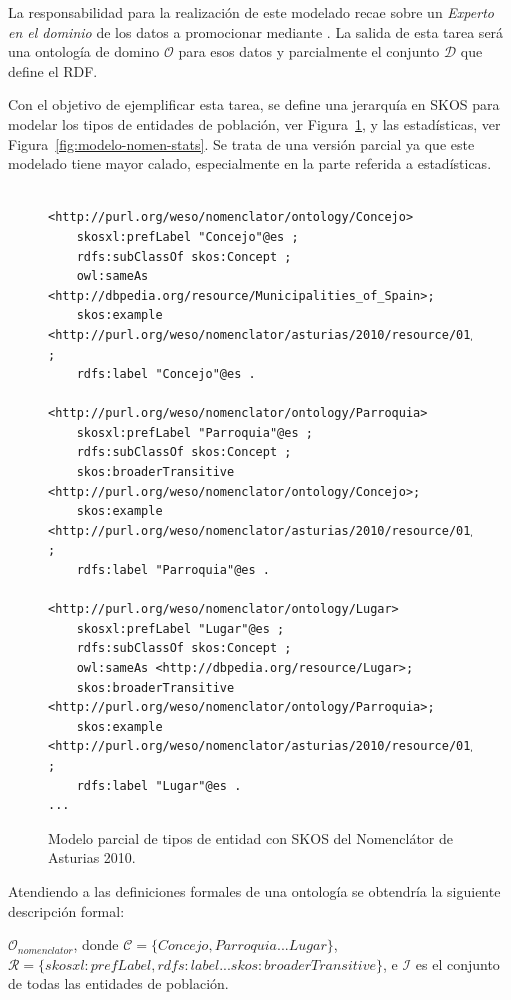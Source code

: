 La responsabilidad para la realización de este modelado recae sobre un \textit{Experto en el dominio} de los datos a promocionar
mediante \linkeddata. La salida de esta tarea será una ontología de domino $\mathcal{O}$ para esos datos y 
parcialmente el conjunto $\mathcal{D}$ que define el \dataset RDF.

Con el objetivo de ejemplificar esta tarea, se define una jerarquía en \gls{SKOS} para modelar
los tipos de entidades de población, ver Figura~\ref{fig:modelo-nomen}, y las estadísticas, ver Figura~\ref{fig:modelo-nomen-stats}. Se
trata de una versión parcial ya que este modelado tiene mayor calado, especialmente en la parte referida a estadísticas.

\begin{figure}[!htp]
\begin{lstlisting}
 
<http://purl.org/weso/nomenclator/ontology/Concejo> 
	skosxl:prefLabel "Concejo"@es ;
	rdfs:subClassOf skos:Concept ;
	owl:sameAs <http://dbpedia.org/resource/Municipalities_of_Spain>;
	skos:example <http://purl.org/weso/nomenclator/asturias/2010/resource/01/00/00> ;
	rdfs:label "Concejo"@es .
	
<http://purl.org/weso/nomenclator/ontology/Parroquia> 
	skosxl:prefLabel "Parroquia"@es ;
	rdfs:subClassOf skos:Concept ;
	skos:broaderTransitive <http://purl.org/weso/nomenclator/ontology/Concejo>;
	skos:example <http://purl.org/weso/nomenclator/asturias/2010/resource/01/01/00> ;
	rdfs:label "Parroquia"@es .

<http://purl.org/weso/nomenclator/ontology/Lugar> 
	skosxl:prefLabel "Lugar"@es ;
	rdfs:subClassOf skos:Concept ;
	owl:sameAs <http://dbpedia.org/resource/Lugar>;
	skos:broaderTransitive <http://purl.org/weso/nomenclator/ontology/Parroquia>;
	skos:example <http://purl.org/weso/nomenclator/asturias/2010/resource/01/02/05> ;
	rdfs:label "Lugar"@es .
...
\end{lstlisting}
	\caption{Modelo parcial de tipos de entidad con SKOS del Nomenclátor de Asturias 2010.}
	\label{fig:modelo-nomen}
\end{figure}

Atendiendo a las definiciones formales de una ontología se obtendría la siguiente descripción formal:

$\mathcal{O}_{nomenclator}$, donde $\mathcal{C} = \{Concejo, Parroquia...Lugar\}$, $\mathcal{R} = \{skosxl:prefLabel, rdfs:label...skos:broaderTransitive\}$,
e $\mathcal{I}$ es el conjunto de todas las entidades de población.

